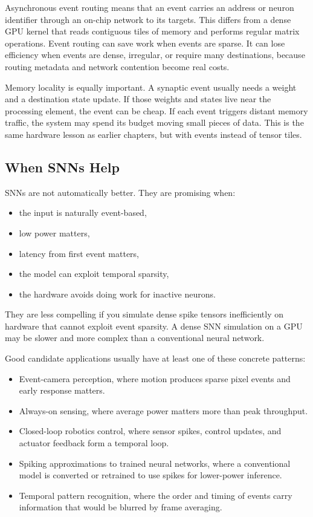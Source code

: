 Asynchronous event routing means that an event carries an address or neuron identifier through an on-chip network to its targets. This differs from a dense GPU kernel that reads contiguous tiles of memory and performs regular matrix operations. Event routing can save work when events are sparse. It can lose efficiency when events are dense, irregular, or require many destinations, because routing metadata and network contention become real costs.

Memory locality is equally important. A synaptic event usually needs a weight and a destination state update. If those weights and states live near the processing element, the event can be cheap. If each event triggers distant memory traffic, the system may spend its budget moving small pieces of data. This is the same hardware lesson as earlier chapters, but with events instead of tensor tiles.

\subsection{When SNNs Help}

SNNs are not automatically better. They are promising when:

\begin{itemize}[leftmargin=*]
  \item the input is naturally event-based,
  \item low power matters,
  \item latency from first event matters,
  \item the model can exploit temporal sparsity,
  \item the hardware avoids doing work for inactive neurons.
\end{itemize}

They are less compelling if you simulate dense spike tensors inefficiently on hardware that cannot exploit event sparsity. A dense SNN simulation on a GPU may be slower and more complex than a conventional neural network.

Good candidate applications usually have at least one of these concrete patterns:

\begin{itemize}[leftmargin=*]
  \item Event-camera perception, where motion produces sparse pixel events and early response matters.
  \item Always-on sensing, where average power matters more than peak throughput.
  \item Closed-loop robotics control, where sensor spikes, control updates, and actuator feedback form a temporal loop.
  \item Spiking approximations to trained neural networks, where a conventional model is converted or retrained to use spikes for lower-power inference.
  \item Temporal pattern recognition, where the order and timing of events carry information that would be blurred by frame averaging.
\end{itemize}

